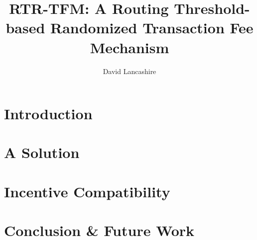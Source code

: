\documentclass[sigconf,anonymous]{aamas}
\title[Routing Threshold-based Randomized Transaction Fee Mechanism]{RTR-TFM: A Routing Threshold-based Randomized Transaction Fee Mechanism}
\author{David Lancashire}
\affiliation{
  \institution{Proclus Technologies}
  \city{Bangkok}
  \country{Thailand}}
\begin{document}
\pagestyle{fancy}

\fancyhead{}
\maketitle 

\section{Introduction \label{sec::introduction}}



\section{A Solution \label{sec::solution}}


\section{Incentive Compatibility \label{sec::compatibility}}


\section{Conclusion \& Future Work \label{sec::conclusion}}





\cleardoublepage
 


\end{document}

